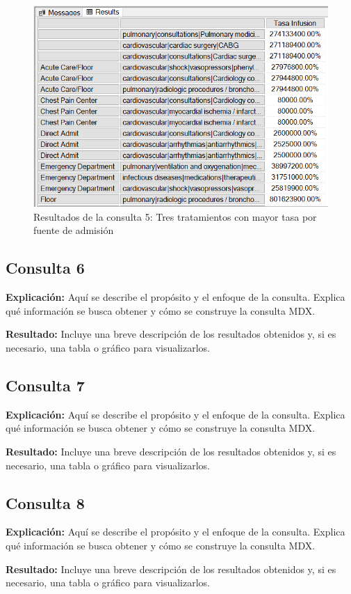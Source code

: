 \documentclass{article}
\begin{document}
\begin{figure}[H]
	\centering
	\includegraphics[width=0.6\linewidth]{images/consulta5.png}
	\caption{Resultados de la consulta 5: Tres tratamientos con mayor tasa por fuente de admisión}
	\label{fig:consulta5}
\end{figure}

\subsection{Consulta 6}

\textbf{Explicación:}  
Aquí se describe el propósito y el enfoque de la consulta. Explica qué información se busca obtener y cómo se construye la consulta MDX.

\textbf{Resultado:}  
Incluye una breve descripción de los resultados obtenidos y, si es necesario, una tabla o gráfico para visualizarlos.

\subsection{Consulta 7}

\textbf{Explicación:}  
Aquí se describe el propósito y el enfoque de la consulta. Explica qué información se busca obtener y cómo se construye la consulta MDX.

\textbf{Resultado:}  
Incluye una breve descripción de los resultados obtenidos y, si es necesario, una tabla o gráfico para visualizarlos.

\subsection{Consulta 8}

\textbf{Explicación:}  
Aquí se describe el propósito y el enfoque de la consulta. Explica qué información se busca obtener y cómo se construye la consulta MDX.

\textbf{Resultado:}  
Incluye una breve descripción de los resultados obtenidos y, si es necesario, una tabla o gráfico para visualizarlos.
\end{document}
